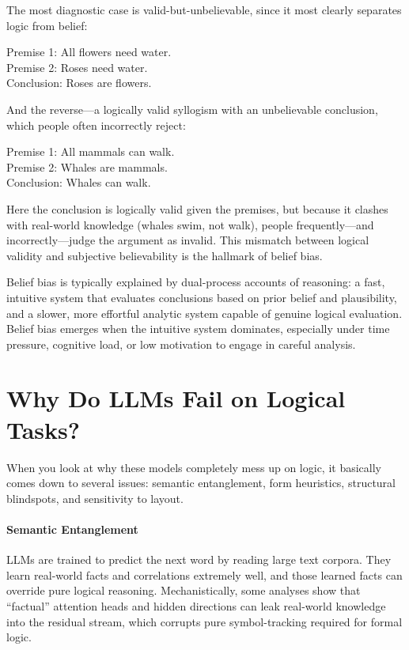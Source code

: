 \documentclass[11pt]{article}
\begin{document}
The most diagnostic case is valid-but-unbelievable, since it most clearly separates logic from belief:

Premise 1: All flowers need water. \\
Premise 2: Roses need water. \\
Conclusion: Roses are flowers.

And the reverse---a logically valid syllogism with an unbelievable conclusion, which people often incorrectly reject:

Premise 1: All mammals can walk. \\
Premise 2: Whales are mammals. \\
Conclusion: Whales can walk.

Here the conclusion is logically valid given the premises, but because it clashes with real-world knowledge (whales swim, not walk), people frequently---and incorrectly---judge the argument as invalid. This mismatch between logical validity and subjective believability is the hallmark of belief bias.

Belief bias is typically explained by dual-process accounts of reasoning: a fast, intuitive system that evaluates conclusions based on prior belief and plausibility, and a slower, more effortful analytic system capable of genuine logical evaluation. Belief bias emerges when the intuitive system dominates, especially under time pressure, cognitive load, or low motivation to engage in careful analysis.

\section{Why Do LLMs Fail on Logical Tasks?}

When you look at why these models completely mess up on logic, it basically comes down to several issues: semantic entanglement, form heuristics, structural blindspots, and sensitivity to layout.

\paragraph{Semantic Entanglement}
LLMs are trained to predict the next word by reading large text corpora. They learn real-world facts and correlations extremely well, and those learned facts can override pure logical reasoning. Mechanistically, some analyses show that ``factual'' attention heads and hidden directions can leak real-world knowledge into the residual stream, which corrupts pure symbol-tracking required for formal logic.
\end{document}
